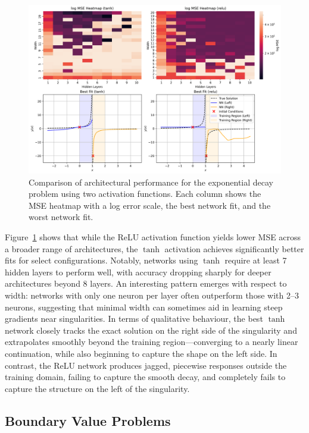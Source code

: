 \begin{figure}[htbp]
    \centering
    \includegraphics[width=\textwidth]{graphics/ivp_singularity_combined.png}
    \caption{Comparison of architectural performance for the exponential decay problem using two 
    activation functions. Each column shows the MSE heatmap with a log error scale,
    the best network fit, and the worst network fit.}
    \label{fig:ivp_singular_sidebyside}
\end{figure}

Figure~\ref{fig:ivp_singular_sidebyside} shows that while the ReLU activation function yields 
lower MSE across a broader range of architectures, the \(\tanh\) activation achieves significantly
better fits for select configurations. Notably, networks using \(\tanh\) require at least 7 hidden 
layers to perform well, with accuracy dropping sharply for deeper architectures beyond 8 layers. 
An interesting pattern emerges with respect to width: networks with only one neuron per layer often 
outperform those with 2–3 neurons, suggesting that minimal width can sometimes aid in learning steep 
gradients near singularities. In terms of qualitative behaviour, the best \(\tanh\) network closely 
tracks the exact solution on the right side of the singularity and extrapolates smoothly beyond the 
training region—converging to a nearly linear continuation, while also beginning to capture the shape
on the left side. In contrast, the ReLU network produces jagged, piecewise responses outside the 
training domain, failing to capture the smooth decay, and completely fails 
to capture the structure on the left of the singularity.



\subsection{Boundary Value Problems}\label{sec:BVPs}


